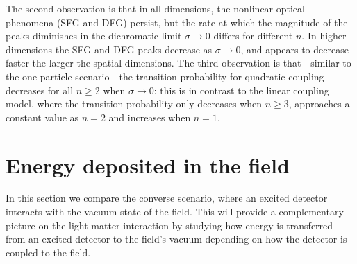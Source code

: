 \documentclass[11pt,prd,onecolumn,superscriptaddress,nofootinbib,floatfix,amsmath,amssymb]{revtex4-2}
\newcommand{\eri}[1]{\textcolor{OliveGreen}{\textbf{[\textbf{\textcolor{black}{Erickson}}: #1]}}}
\begin{document}
    
    The second observation is that in all dimensions, the nonlinear optical phenomena (SFG and DFG) persist, but the rate at which the magnitude of the peaks diminishes in the dichromatic limit $\sigma\to 0$ differs for different $n$. In higher dimensions the SFG and DFG peaks decrease as $\sigma\to 0$, and appears to decrease faster the larger the spatial dimensions. The third observation is that---similar to the one-particle scenario---the transition probability for quadratic coupling decreases for all $n\geq 2$ when $\sigma\to 0$: this is in contrast to the linear coupling model, where the transition probability only decreases when $n\geq 3$, approaches a constant value as $n=2$ and increases when $n=1$.
    
    
    
    
    
    
    
    
    
    
    
    
    
    
    
   




    





    \section{Energy deposited in the field}
    \label{sec:energydeposit}
    
    
    In this section we compare the converse scenario, where an excited detector interacts with the vacuum state of the field. This will provide a complementary picture on the light-matter interaction by studying how energy is transferred from an excited detector to the field's vacuum depending on how the detector is coupled to the field. 
    
\end{document}

